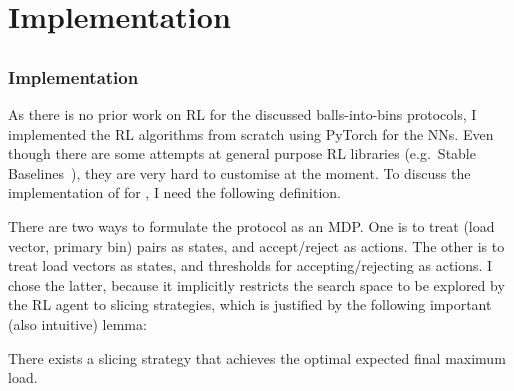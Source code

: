 \chapter{Implementation}\label{implementation}

\ifpdf
    \graphicspath{{Chapter3/Figs/Raster/}{Chapter3/Figs/PDF/}{Chapter3/Figs/}}
\else
    \graphicspath{{Chapter3/Figs/Vector/}{Chapter3/Figs/}}
\fi



\section{\TwoThinning}





\subsection{\DQL Implementation} \label{dqn-implmentation-two-thinning}


As there is no prior work on RL for the discussed balls-into-bins protocols, I implemented the RL algorithms from scratch using PyTorch for the NNs. Even though there are some attempts at general purpose RL libraries (e.g.\ Stable Baselines~\cite{hill2018stablebaselines}), they are very hard to customise at the moment. To discuss the implementation of \DQL for \TwoThinning, I need the following definition.


There are two ways to formulate the \TwoThinning protocol as an MDP. One is to treat (load vector, primary bin) pairs as states, and accept/reject as actions. The other is to treat load vectors as states, and thresholds for accepting/rejecting as actions. I chose the latter, because it implicitly restricts the search space to be explored by the RL agent to slicing strategies, which is justified by the following important (also intuitive) lemma:


\begin{lemma} \label{lemma: thresholdproperty}
There exists a slicing strategy that achieves the optimal expected final maximum load.
\end{lemma}


